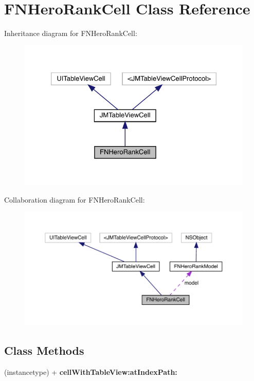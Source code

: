 \hypertarget{interface_f_n_hero_rank_cell}{}\section{F\+N\+Hero\+Rank\+Cell Class Reference}
\label{interface_f_n_hero_rank_cell}


Inheritance diagram for F\+N\+Hero\+Rank\+Cell\+:\nopagebreak
\begin{figure}[H]
\begin{center}
\leavevmode
\includegraphics[width=326pt]{interface_f_n_hero_rank_cell__inherit__graph}
\end{center}
\end{figure}


Collaboration diagram for F\+N\+Hero\+Rank\+Cell\+:\nopagebreak
\begin{figure}[H]
\begin{center}
\leavevmode
\includegraphics[width=350pt]{interface_f_n_hero_rank_cell__coll__graph}
\end{center}
\end{figure}
\subsection*{Class Methods}
\begin{DoxyCompactItemize}
\item 
\mbox{\label{interface_f_n_hero_rank_cell_a563d261a9bfe40f5a1d091f915454234}} 
(instancetype) + {\bfseries cell\+With\+Table\+View\+:at\+Index\+Path\+:}
\end{DoxyCompactItemize}
